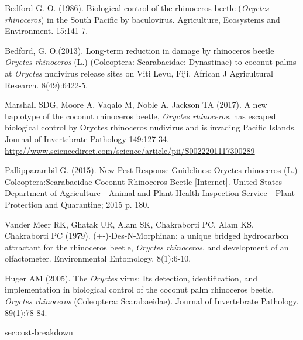 \documentclass[11pt,english,letterpaper]{scrartcl}
\begin{document}
\begingroup
\renewcommand{\section}[2]{}%
\begin{thebibliography}{1}
	
 Bedford G. O. (1986). Biological control of the rhinoceros beetle (\textit{Oryctes rhinoceros}) in the South Pacific by baculovirus. Agriculture, Ecosystems and Environment. 15:141-7.

 Bedford, G. O.(2013). Long-term reduction in damage by rhinoceros beetle \textit{Oryctes rhinoceros} (L.) (Coleoptera: Scarabaeidae: Dynastinae) to coconut palms at \textit{Oryctes} nudivirus release sites on Viti Levu, Fiji. African J Agricultural Research. 8(49):6422-5. 

 Marshall SDG, Moore A, Vaqalo M, Noble A, Jackson TA (2017). A new haplotype of the coconut rhinoceros beetle, \textit{Oryctes rhinoceros}, has escaped biological control by Oryctes rhinoceros nudivirus and is invading Pacific Islands. Journal of Invertebrate Pathology 149:127-34. 
\url{ http://www.sciencedirect.com/science/article/pii/S0022201117300289}

 Pallipparambil G. (2015). New Pest Response Guidelines: Oryctes rhinoceros (L.) Coleoptera:Scarabaeidae Coconut Rhinoceros Beetle [Internet]. United States Department of Agriculture - Animal and Plant Health Inspection Service - Plant Protection and Quarantine; 2015 p. 180.

 Vander Meer RK, Ghatak UR, Alam SK, Chakraborti PC, Alam KS, Chakraborti PC (1979). (+-)-Des-N-Morphinan: a unique bridged hydrocarbon attractant for the rhinoceros beetle, \textit{Oryctes rhinoceros}, and development of an olfactometer. Environmental Entomology. 8(1):6-10. 

 Huger AM (2005). The \textit{Oryctes} virus: Its detection, identification, and implementation in biological control of the coconut palm rhinoceros beetle, \textit{Oryctes rhinoceros} (Coleoptera: Scarabaeidae). Journal of Invertebrate Pathology. 89(1):78-84.

\end{thebibliography}
\endgroup


\newpage
\section{Cost Breakdown Narrative}
\label{sec:cost-breakdown}
\end{document}

